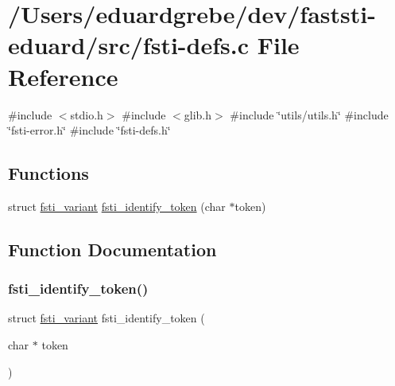 \hypertarget{fsti-defs_8c}{}\section{/\+Users/eduardgrebe/dev/faststi-\/eduard/src/fsti-\/defs.c File Reference}
\label{fsti-defs_8c}
{\ttfamily \#include $<$stdio.\+h$>$}\newline
{\ttfamily \#include $<$glib.\+h$>$}\newline
{\ttfamily \#include \char`\"{}utils/utils.\+h\char`\"{}}\newline
{\ttfamily \#include \char`\"{}fsti-\/error.\+h\char`\"{}}\newline
{\ttfamily \#include \char`\"{}fsti-\/defs.\+h\char`\"{}}\newline
\subsection*{Functions}
\begin{DoxyCompactItemize}
\item 
struct \mbox{\hyperlink{structfsti__variant}{fsti\+\_\+variant}} \mbox{\hyperlink{fsti-defs_8c_a9bbd967a26845252b0a412468c33b0d4}{fsti\+\_\+identify\+\_\+token}} (char $\ast$token)
\end{DoxyCompactItemize}


\subsection{Function Documentation}
\mbox{\label{fsti-defs_8c_a9bbd967a26845252b0a412468c33b0d4}} 
\subsubsection{\texorpdfstring{fsti\+\_\+identify\+\_\+token()}{fsti\_identify\_token()}}
{\footnotesize\ttfamily struct \mbox{\hyperlink{structfsti__variant}{fsti\+\_\+variant}} fsti\+\_\+identify\+\_\+token (\begin{DoxyParamCaption}\item[{char $\ast$}]{token }\end{DoxyParamCaption})}

